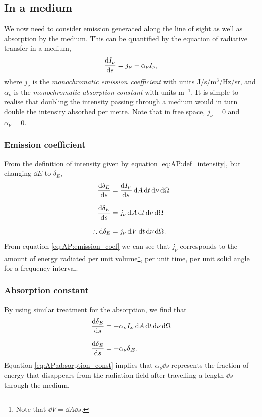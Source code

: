 \subsection{In a medium}
We now need  to consider emission generated along the line of sight as well as absorption by the medium.
 This can be quantified by the equation of radiative transfer in a medium,
%
\begin{equation}
	\dv{I_\nu}{s} = j_\nu - \alpha_\nu I_\nu,
	\label{eq:AP:radiative_transfer}
\end{equation}
%
where \(j_\nu\) is the \emph{monochromatic emission coefficient} with units J/s/m\(^3\)/Hz/sr, and \(\alpha_\nu\) is the \emph{monochromatic absorption constant} with units m\(^{-1}\).
 It is simple to realise that doubling the intensity passing through a medium would in turn double the intensity absorbed per metre.
 Note that in free space, \(j_\nu = 0\) and \(\alpha_\nu = 0\).
\par
%
\subsubsection{Emission coefficient}
From the definition of intensity given by equation \ref{eq:AP:def_intensity}, but changing \(\dd{E}\) to \(\delta_E\),
%
\begin{align}
	\dv{\delta_E}{s} &= \dv{I_\nu}{s} \dd{A} \dd{t} \dd{\nu} \dd{\Omega}
	\linedrop
	\dv{\delta_E}{s} &= j_\nu \dd{A} \dd{t} \dd{\nu} \dd{\Omega}
	\linedrop
	\therefore \dd{\delta_E} &= j_\nu \dd{V} \dd{t} \dd{\nu} \dd{\Omega}.
	\label{eq:AP:emission_coef}
\end{align}
%
From equation \ref{eq:AP:emission_coef} we can see that \(j_\nu\) corresponds to the amount of energy radiated per unit volume\footnote{Note that \(\dd{V} = \dd{A} \dd{s}\).}, per unit time, per unit solid angle for a frequency interval.
% 
\subsubsection{Absorption constant}
By using similar treatment for the absorption, we find that
%
\begin{align}
		\dv{\delta_E}{s} &= -\alpha_\nu I_\nu  \dd{A} \dd{t} \dd{\nu} \dd{\Omega}
		\linedrop
		\dv{\delta_E}{s} &= -\alpha_\nu \delta_E.
		\label{eq:AP:absorption_const}
\end{align}
%
Equation \ref{eq:AP:absorption_const} implies that \(\alpha_\nu \dd{s}\) represents the fraction of energy that disappears from the radiation field after travelling a length \(\dd{s}\) through the medium.
%  

